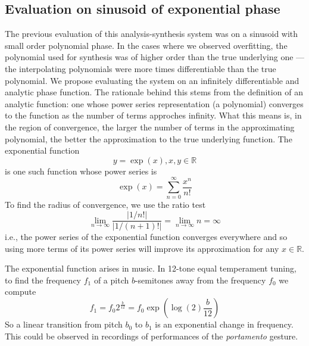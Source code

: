 
\subsection{Evaluation on sinusoid of exponential phase \label{sec:evalexpphase}}

The previous evaluation of this analysis-synthesis system was on a sinusoid with
small order polynomial phase. In the cases where we observed overfitting, the
polynomial used for synthesis was of higher order than the true underlying one
--- the interpolating polynomials were more times differentiable than the true
polynomial. We propose evaluating the system on an infinitely differentiable and
analytic phase function. The rationale behind this stems from the definition of
an analytic function: one whose power series representation (a polynomial)
converges to the function as the number of terms approches infinity. What this
means is, in the region of convergence, the larger the number of terms in the
approximating polynomial, the better the approximation to the true underlying
function. The exponential function
\[
    y=\exp(x), x,y \in \mathbb{R}
\]
is one such function whose power series is
\[
    \exp(x)=\sum_{n=0}^{\infty} \frac{x^{n}}{n!}
\]
To find the radius of convergence, we use the ratio test
\[
    \lim_{n \rightarrow \infty} \frac{|1/n!|}{|1/(n+1)!|} = \lim_{n \rightarrow \infty} n = \infty
\]
i.e., the power series of the exponential function converges everywhere and so
using more terms of its power series will improve its approximation for
any $x \in \mathbb{R}$.

The exponential function arises in music. In 12-tone equal temperament tuning,
to find the frequency $f_{1}$ of a pitch $b$-semitones away from the frequency
$f_{0}$ we compute
\[
    f_{1}=f_{0}2^{\frac{b}{12}}=f_{0}\exp(\log(2)\frac{b}{12})
\]
So a linear transition from pitch $b_{0}$ to $b_{1}$ is an exponential change in
frequency. This could be observed in recordings of performances of the
\textit{portamento} gesture.

